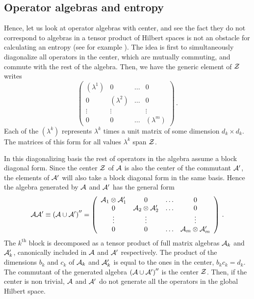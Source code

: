 \documentclass[12pt,a4paper]{article}
\begin{document}
\subsection{Operator algebras and entropy}
Hence, let us look at operator algebras with center, and see the fact they do not correspond to algebras in a tensor product of Hilbert spaces is 
not an obstacle for calculating an entropy (see for example \cite{petz}). The idea is first to simultaneously diagonalize all operators in the center, 
which are mutually commuting, and commute with the rest of the algebra. Then, we have the generic element of ${\cal Z}$ writes 
\begin{equation} 
\left(\begin{array}{cccc}
(\lambda^1) & 0 & \hdots & 0 \\
0 & (\lambda^2) & \hdots & 0 \\
\vdots & \vdots & &\vdots \\
0 & 0 & \hdots & (\lambda^m)
\end{array}\right)\,.
\end{equation}
Each of the $(\lambda^k)$ represents  $\lambda^k$ times a unit matrix of some dimension $d_k \times d_k$. The matrices of this form for all 
values $\lambda^k$ span ${\cal Z}$. 

In this diagonalizing basis the rest of operators in the algebra assume a block diagonal form. Since the center ${\cal Z}$ of ${\cal A}$ is also 
the center of the commutant ${\cal A}^\prime$, the elements of ${\cal A}^\prime$ will also take a block diagonal form in the same basis.  
Hence the algebra generated by ${\cal A}$ and ${\cal A}^\prime$ has the general form   
\begin{equation}
{\cal A}{\cal A}^\prime\equiv \left({\cal A}\cup {\cal A}^\prime\right)^{\prime\prime}= 
\left(\begin{array}{cccc}
{\cal A}_1\otimes {\cal A}_1^\prime & 0 & \hdots & 0 \\
0 & {\cal A}_2\otimes {\cal A}_2^\prime & \hdots & 0 \\
\vdots & \vdots & &\vdots \\
0 & 0 & \hdots & {\cal A}_m\otimes {\cal A}_m^\prime 
\end{array}\right)\,.
\end{equation}
The $k^{\textrm{th}}$ block is decomposed as a tensor product of full matrix algebras ${\cal A}_k$ and ${\cal A}_k^\prime$, canonically 
included in ${\cal A}$ and ${\cal A}^\prime$ respectively. The product of the dimensions $b_k$ and $c_k$ of ${\cal A}_k$ and ${\cal A}_k^\prime$ 
is equal to the ones in the center, $b_k c_k=d_k$.  The commutant of the generated algebra $\left({\cal A}\cup {\cal A}^\prime\right)^{\prime\prime}$ 
is the center ${\cal Z}$. Then, if the center is non trivial, ${\cal A}$ and ${\cal A}^\prime$ do not generate all the operators in the global Hilbert space. 
\end{document}
